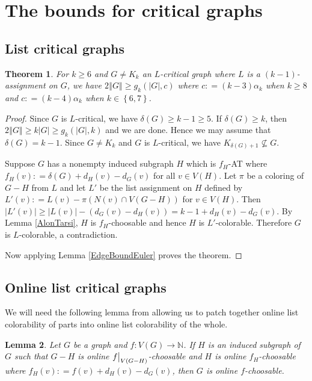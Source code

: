 \documentclass[12pt]{article}
\theoremstyle{plain}
\newtheorem{thm}{Theorem}[section]
\newtheorem{lem}[thm]{Lemma}
\theoremstyle{definition}
\theoremstyle{remark}
\newcommand{\IN}{\mathbb{N}}
\newcommand{\set}[1]{\left\{ #1 \right\}}
\newcommand{\card}[1]{\left|#1\right|}
\newcommand{\size}[1]{\left\Vert#1\right\Vert}
\newcommand{\func}[3]{#1\colon #2 \rightarrow #3}
\newcommand{\DefinedAs}{\mathrel{\mathop:}=}
\newcommand\restr[2]{{%
  \left.\kern-\nulldelimiterspace %
  #1 %
  \vphantom{\big|} %
  \right|_{#2} %
  }}
\begin{document}
\section{The bounds for critical graphs}
\subsection{List critical graphs}
\begin{thm}\label{EdgeBound}
For $k \geq 6$ and $G \neq K_k$ an $L$-critical graph where $L$ is a $(k-1)$-assignment on $G$, we have  $2\size{G} \geq g_k(\card{G}, c)$ where $c \DefinedAs (k-3)\alpha_k$ when $k \geq 8$ and $c \DefinedAs (k-4)\alpha_k$ when $k \in \set{6,7}$.
\end{thm}
\begin{proof}
Since $G$ is $L$-critical, we have $\delta(G) \geq k - 1 \geq 5$. If $\delta(G) \geq k$, then $2\size{G} \geq k\card{G} \geq g_k(\card{G}, k)$ and we are done.  Hence we may assume that $\delta(G) = k-1$.  Since $G \neq K_k$ and $G$ is $L$-critical, we have $K_{\delta(G) + 1} \not \subseteq G$.  

Suppose $G$ has a nonempty induced subgraph $H$ which is $f_H$-AT where $f_H(v) \DefinedAs \delta(G) + d_H(v) - d_G(v)$ for all $v \in V(H)$.  Let $\pi$ be a coloring of $G-H$ from $L$ and let $L'$ be the list assignment on $H$ defined by $L'(v) \DefinedAs L(v) - \pi(N(v) \cap V(G-H))$ for $v \in V(H)$.  Then $\card{L'(v)} \geq \card{L(v)} - (d_G(v) - d_H(v)) = k - 1 + d_H(v) - d_G(v)$.  By Lemma \ref{AlonTarsi}, $H$ is $f_H$-choosable and hence $H$ is $L'$-colorable.  Therefore $G$ is $L$-colorable, a contradiction.

Now applying Lemma \ref{EdgeBoundEuler} proves the theorem.
\end{proof}

\subsection{Online list critical graphs}
We will need the following lemma from \cite{schauz2009mr} allowing us to patch together online list colorability of parts into online list colorability of the whole.

\begin{lem}\label{CutLemma}
Let $G$ be a graph and $\func{f}{V(G)}{\IN}$.  If $H$ is an induced subgraph of $G$ such that $G-H$ is online $\restr{f}{V(G-H)}$-choosable and $H$ is online $f_H$-choosable where $f_H(v) \DefinedAs f(v) + d_H(v) - d_G(v)$, then $G$ is online $f$-choosable.
\end{lem}
\end{document}
